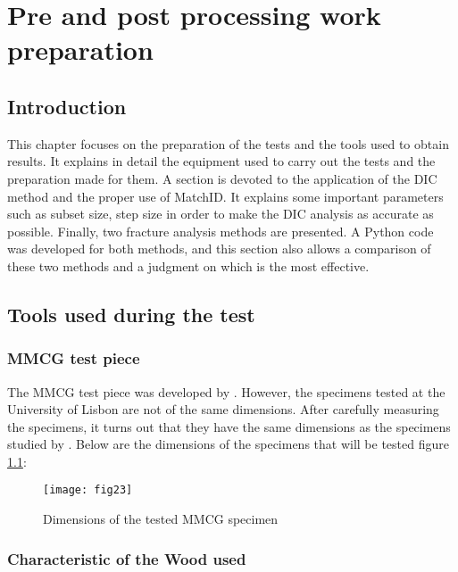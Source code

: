 \chapter{Pre and post processing work preparation}
\label{Chapter2}

\section{Introduction}

This chapter focuses on the preparation of the tests and the tools used to obtain results. It explains in detail the equipment used to carry out the tests and the preparation made for them. A section is devoted to the application of the DIC method and the proper use of MatchID. It explains some important parameters such as subset size, step size in order to make the DIC analysis as accurate as possible.
Finally, two fracture analysis methods are presented. A Python code was developed for both methods, and this section also allows a comparison of these two methods and a judgment on which is the most effective.

\section{Tools used during the test}

\subsection{MMCG test piece}

The MMCG test piece was developed by \cite{MoutouPitti2008}. However, the specimens tested at the University of Lisbon are not of the same dimensions. After carefully measuring the specimens, it turns out that they have the same dimensions as the specimens studied by \cite{Odounga2018phd}. Below are the dimensions of the specimens that will be tested figure \ref{fig:fig23}:


\begin{figure}[htp]
	\centering
	\texttt{[image: fig23]}
	\caption{Dimensions of the tested MMCG specimen}
	\label{fig:fig23}
\end{figure}

\subsection{Characteristic of the Wood used}

